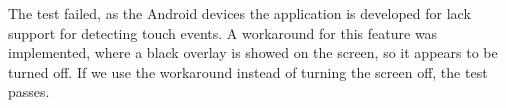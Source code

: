 The test failed, as the Android devices the application is developed for lack support for detecting touch events. A workaround for this feature was implemented, where a black overlay is showed on the screen, so it appears to be turned off. If we use the workaround instead of turning the screen off, the test passes.